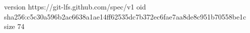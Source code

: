 version https://git-lfs.github.com/spec/v1
oid sha256:c5c30a596b2ac6638a1ae14ff62535dc7b372ec6fae7aa8de8c951b70558be1c
size 74
